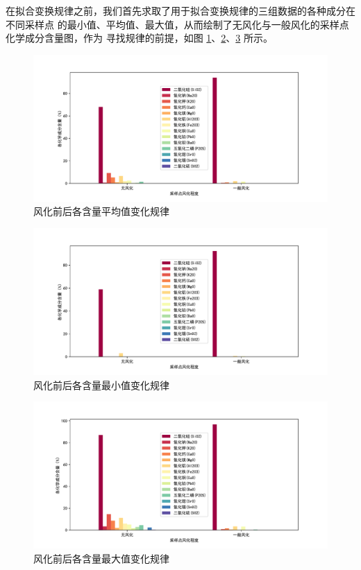 \documentclass[withoutpreface,bwprint]{cumcmthesis} %
\begin{document}
在拟合变换规律之前，我们首先求取了用于拟合变换规律的三组数据的各种成分在不同采样点
的最小值、平均值、最大值，从而绘制了无风化与一般风化的采样点化学成分含量图，作为
寻找规律的前提，如图 \ref{fig:HighKaverage}、\ref{fig:HighKmin}、\ref{fig:HighKmax}
所示。
\begin{figure}[!htb]
    \centering
    \includegraphics[scale=0.35]{高钾玻璃含量平均值一般风化前后对比.pdf}
    \caption{风化前后各含量平均值变化规律}
    \label{fig:HighKaverage}
\end{figure}
\begin{figure}
    [!htb]
    \centering
    \includegraphics[scale=0.35]{高钾玻璃含量最小值一般风化前后对比.pdf}
    \caption{风化前后各含量最小值变化规律}
    \label{fig:HighKmin}
\end{figure}
\begin{figure}
    [!htb]
    \centering
    \includegraphics[scale=0.35]{高钾玻璃含量最大值一般风化前后对比.pdf}
    \caption{风化前后各含量最大值变化规律}
    \label{fig:HighKmax}
\end{figure}
\end{document}
